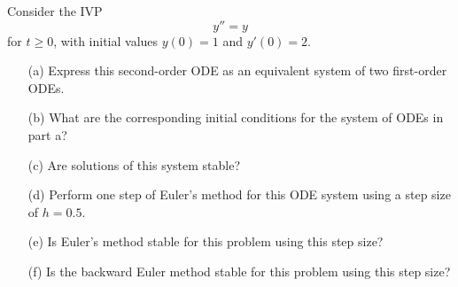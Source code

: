 \begin{pro}
  Consider the IVP
  \begin{displaymath}
    y'' = y
  \end{displaymath}
  for $t\ge 0$,
  with initial values $y(0)=1$ and $y'(0)=2$.
  \begin{itemize}
  \item[(a)]
    Express this second-order ODE as
    an equivalent system of two first-order ODEs.

  \item[(b)]
    What are the corresponding initial conditions for the system of
    ODEs in part a?

  \item[(c)]
    Are solutions of this system stable?

  \item[(d)]
    Perform one step of Euler's method for this ODE system
    using a step size of $h=0.5$.

  \item[(e)]
    Is Euler's method stable for this problem using this step size?

  \item[(f)]
    Is the backward Euler method stable for this problem
    using this step size?
  \end{itemize}
\end{pro}

